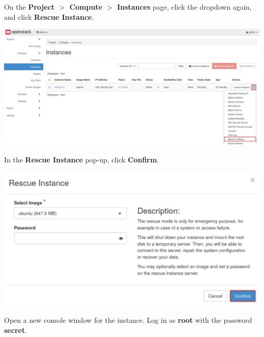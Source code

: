 \documentclass[letterpaper, 12pt]{article}
\begin{document}
\begin{enumerate}
    \begin{labstep}
        On the \textbf{Project $>$ Compute $>$ Instances} page, click the dropdown again, and click \textbf{Rescue Instance}.

        \begin{center}
            \includegraphics[width=\linewidth]{images/part7/step14.png}
        \end{center}
    \end{labstep}

    \begin{labstep}
        In the \textbf{Rescue Instance} pop-up, click \textbf{Confirm}.

        \begin{center}
            \includegraphics[width=\linewidth]{images/part7/step15.png}
        \end{center}
    \end{labstep}

    \begin{labstep}
        Open a new console window for the instance.
        Log in as \textbf{root} with the password \textbf{secret}.


\end{labstep}
\end{enumerate}
\end{document}
